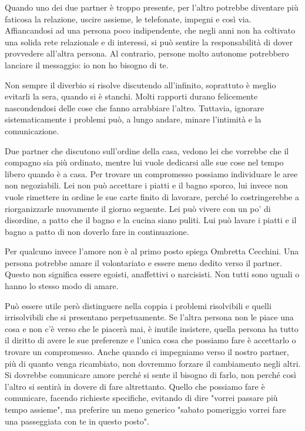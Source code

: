 \documentclass[12pt]{book} %
\begin{document}
Quando uno dei due partner è troppo presente, per l'altro potrebbe diventare più faticosa la relazione, uscire assieme, le telefonate, impegni e così via. Affiancandosi ad una persona poco indipendente, che negli anni non ha coltivato una solida rete relazionale e di interessi, si può sentire la responsabilità di dover provvedere all'altra persona. Al contrario, persone molto autonome potrebbero lanciare il messaggio: io non ho bisogno di te.

Non sempre il diverbio si risolve discutendo all'infinito, soprattuto è meglio evitarli la sera, quando si è stanchi.
Molti rapporti durano felicemente nascondendosi delle cose che fanno arrabbiare l'altro. Tuttavia, ignorare sistematicamente i problemi può, a lungo andare, minare l’intimità e la comunicazione.

Due partner che discutono sull'ordine della casa, vedono lei che vorrebbe che il compagno sia più ordinato,
mentre lui vuole dedicarsi alle sue cose nel tempo libero quando è a casa. Per trovare un compromesso
possiamo individuare le aree non negoziabili. Lei non può accettare i piatti e il bagno sporco, lui invece non vuole
rimettere in ordine le sue carte finito di lavorare, perché lo costringerebbe a riorganizzarle nuovamente il giorno
seguente. Lei può vivere con un po' di disordine, a patto che il bagno e la cucina siano
puliti. Lui può lavare i piatti e il bagno a patto di non doverlo fare in continuazione. 

Per qualcuno invece l'amore non è al primo posto spiega Ombretta Cecchini. Una persona potrebbe amare il volontariato e essere meno dedito verso il partner. Questo non significa essere egoisti, anaffettivi o narcisisti. Non tutti sono uguali o hanno lo stesso modo di amare. 

Può essere utile però distinguere nella coppia i problemi risolvibili e quelli irrisolvibili che si presentano perpetuamente. Se l'altra persona non le piace una cosa e non c'è verso che le piacerà mai, è inutile insistere, quella persona ha tutto il diritto di avere le sue preferenze e l'unica cosa che possiamo fare è accettarlo o trovare un compromesso.
Anche quando ci impegniamo verso il nostro partner, più di quanto venga ricambiato, non dovremmo forzare il cambiamento negli altri.
Si dovrebbe comunicare amore perché si sente il bisogno di farlo, non perché così l'altro si sentirà in dovere di fare altrettanto.
Quello che possiamo fare è comunicare, facendo richieste specifiche, evitando di dire "vorrei passare più tempo assieme", ma preferire un meno generico "sabato pomeriggio vorrei fare una passeggiata con te in questo posto".
\end{document}
